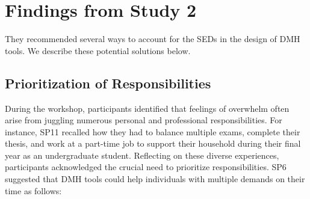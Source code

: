 \section{Findings from Study 2}

They recommended several ways to account for the SEDs in the design of DMH tools. We describe these potential solutions below.


\subsection{Prioritization of Responsibilities}
During the workshop, participants identified that feelings of overwhelm often arise from juggling numerous personal and professional responsibilities. For instance, SP11 recalled how they had to balance multiple exams, complete their thesis, and work at a part-time job to support their household during their final year as an undergraduate student. 
Reflecting on these diverse experiences, participants acknowledged the crucial need to prioritize responsibilities. SP6 suggested that DMH tools could help individuals with multiple demands on their time as follows:


